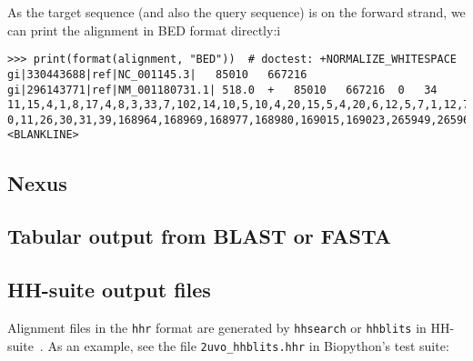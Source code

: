 As the target sequence (and also the query sequence) is on the forward strand, we can print the alignment in BED format directly:i
\begin{verbatim}
>>> print(format(alignment, "BED"))  # doctest: +NORMALIZE_WHITESPACE
gi|330443688|ref|NC_001145.3|	85010	667216	gi|296143771|ref|NM_001180731.1| 518.0	+	85010	667216	0	34	11,15,4,1,8,17,4,8,3,33,7,102,14,10,5,10,4,20,15,5,4,20,6,12,5,7,1,12,75,6,4,2,3,41,	0,11,26,30,31,39,168964,168969,168977,168980,169015,169023,265949,265965,265975,265982,265992,265997,266017,266033,266038,388160,388185,582030,582044,582049,582058,582060,582072,582147,582153,582158,582161,582165,
<BLANKLINE>
\end{verbatim}


\subsection{Nexus}
\label{subsec:align_nexus}

\subsection{Tabular output from BLAST or FASTA}
\label{subsec:align_tabular}

\subsection{HH-suite output files}
\label{subsec:align_hhr}

Alignment files in the \verb|hhr| format are generated by \verb+hhsearch+ or \verb+hhblits+ in HH-suite~\cite{steinegger2019}.
As an example, see the file \verb+2uvo_hhblits.hhr+ in Biopython's test suite:

